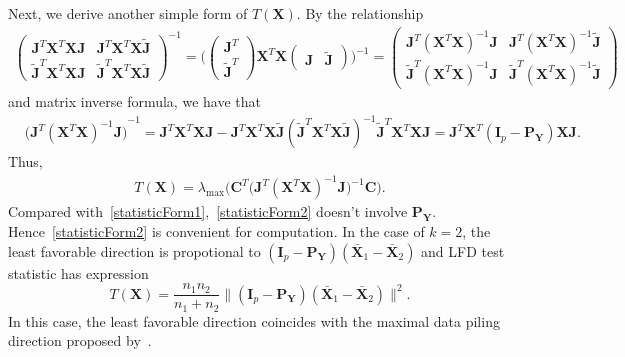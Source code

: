 \documentclass[12pt]{article} %
\newcommand{\bX}{\mathbf{X}}
\newcommand{\bP}{\mathbf{P}}
\newcommand{\bY}{\mathbf{Y}}
\newcommand{\bJ}{\mathbf{J}}
\newcommand{\bC}{\mathbf{C}}
\newcommand{\bI}{\mathbf{I}}
\theoremstyle{definition}
\begin{document}
Next, we derive another simple form of $T(\bX)$.
By the relationship
\begin{equation*}
    \begin{aligned}
        \begin{pmatrix}
            \bJ^T \bX^T \bX\bJ & \bJ^T \bX^T \bX\tilde{\bJ}\\
            \tilde{\bJ}^T \bX^T \bX \bJ & \tilde{\bJ}^T \bX^T \bX \tilde{\bJ}
        \end{pmatrix}^{-1}
        =
        \Big(
        \begin{pmatrix}
            \bJ^T\\
            \tilde{\bJ}^T
        \end{pmatrix}
        \bX^T \bX
        \begin{pmatrix}
            \bJ &\tilde{\bJ}
        \end{pmatrix}
        \Big)^{-1}
        =
        \begin{pmatrix}
            \bJ^T {(\bX^T \bX)}^{-1}\bJ & \bJ^T {(\bX^T \bX)}^{-1}\tilde{\bJ}\\
            \tilde{\bJ}^T {(\bX^T \bX)}^{-1}\bJ & \tilde{\bJ}^T {(\bX^T \bX)}^{-1} \tilde{\bJ}
        \end{pmatrix}
    \end{aligned}
\end{equation*}
and matrix inverse formula, we have that
\begin{equation*}
    \begin{aligned}
        &{\big( \bJ^T {(\bX^T \bX)}^{-1}\bJ \big)}^{-1}
        =\bJ^T \bX^T \bX \bJ - \bJ^T \bX^T \bX\tilde{\bJ}{(\tilde{\bJ}^T \bX^T \bX \tilde{\bJ})}^{-1}
            \tilde{\bJ}^T \bX^T \bX\bJ 
        = \bJ^T \bX^T( \bI_p- \bP_{\bY}) \bX \bJ.
    \end{aligned}
\end{equation*}
Thus, 
\begin{equation}\label{statisticForm2}
    \begin{aligned}
        T(\bX)=
        \lambda_{\max}\Big(\bC^T\big( \bJ^T (\bX^T \bX)^{-1}\bJ \big)^{-1}\bC\Big).
    \end{aligned}
\end{equation}
Compared with~\eqref{statisticForm1},~\eqref{statisticForm2} doesn't involve $\bP_{\bY}$.
Hence~\eqref{statisticForm2} is convenient for computation.
In the case of $k=2$, the least favorable direction is propotional to
$
(\bI_p-\bP_{\bY}) (\bar{\bX}_1-\bar{\bX}_2)
$ and LFD test statistic has expression
$$
T(\bX)=\frac{n_1 n_2}{n_1+n_2}\| (\bI_p-\bP_{\bY}) (\bar{\bX}_1-\bar{\bX}_2)\|^2.
$$
In this case, 
the least favorable direction coincides with the maximal data piling direction proposed by~\cite{Ahn2010}.
\end{document}
